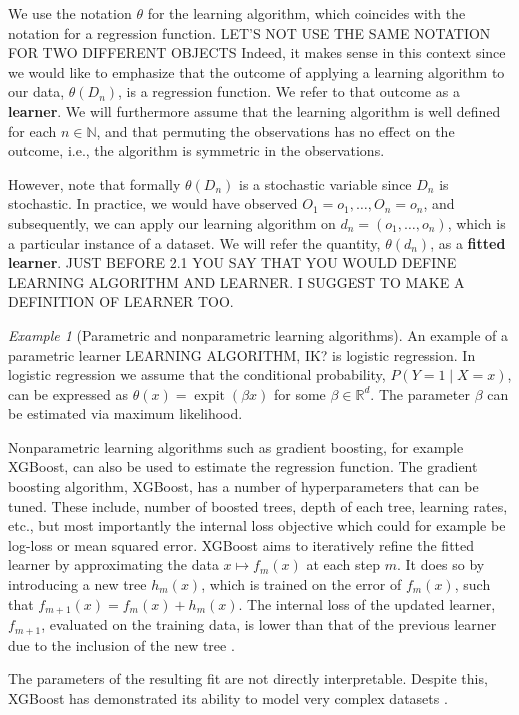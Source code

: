 \documentclass[11pt, a4paper]{article}
\renewcommand\tag[1]{\color{blue} #1 \color{black}}
\theoremstyle{definition}
\theoremstyle{remark}
\newtheorem{example}{Example}
\newcommand{\btheta}{\theta}
\DeclareMathOperator{\expit}{expit}
\begin{document}
We use the notation $ \btheta $ for the learning algorithm, which
coincides with the notation for a regression function.
\tag{LET'S NOT USE THE SAME NOTATION FOR TWO DIFFERENT OBJECTS}
Indeed, it
makes sense in this context since we would like to emphasize that the
outcome of applying a learning algorithm to our data, $\btheta(D_n) $,
is a regression function. We refer to that outcome as a
\textbf{learner}. We will furthermore assume that the learning
algorithm is well defined for each $ n \in \mathbb{N} $, and that
permuting the observations has no effect on the outcome, i.e., the
algorithm is symmetric in the observations.

However, note that formally $ \btheta(D_n) $ is a stochastic variable
since $ D_n $ is stochastic. In practice, we would have observed
$ O_1 = o_1, \dots, O_n = o_n $, and subsequently, we can apply our
learning algorithm on $ d_n = (o_1 , \dots , o_n) $, which is a
particular instance of a dataset. We will refer the quantity,
$ \btheta(d_n) $, as a \textbf{fitted learner}. \tag{JUST BEFORE 2.1 YOU SAY THAT YOU WOULD DEFINE LEARNING ALGORITHM AND LEARNER. I SUGGEST TO MAKE A DEFINITION OF LEARNER TOO.}
\begin{example}[Parametric and nonparametric learning algorithms]
  An example of a parametric learner \tag{LEARNING ALGORITHM, IK?}is logistic regression. In
  logistic regression we assume that the conditional probability,
  $ P(Y = 1 \mid X = x) $, can be expressed as
  $ \btheta(x) = \expit( \beta x) $ for some
  $ \beta \in \mathbb{R}^{d} $. The parameter $ \beta $ can be
  estimated via maximum likelihood.

    Nonparametric learning algorithms such as gradient boosting, for
    example XGBoost, can also be used to estimate the regression
    function. The gradient boosting algorithm, XGBoost, has a number
    of hyperparameters that can be tuned. These include, number of
    boosted trees, depth of each tree, learning rates, etc., but most
    importantly the internal loss objective which could for example be
    log-loss or mean squared error. XGBoost aims to iteratively refine
    the fitted learner by approximating the data $x \mapsto f_m(x)$ at
    each step $m$. It does so by introducing a new tree $h_m(x)$,
    which is trained on the error of $ f_m(x)$, such that
    $f_{m + 1}(x) = f_m(x) + h_m(x)$. The internal loss of the updated
    learner, $f_{m + 1}$, evaluated on the training data, is lower
    than that of the previous learner due to the inclusion of the new
    tree \parencite{chen2016xgboost}.

The parameters of the resulting fit are not directly interpretable. Despite this, XGBoost has demonstrated its ability to model very complex datasets \parencite{chen2016xgboost}.

\end{example}
\end{document}
